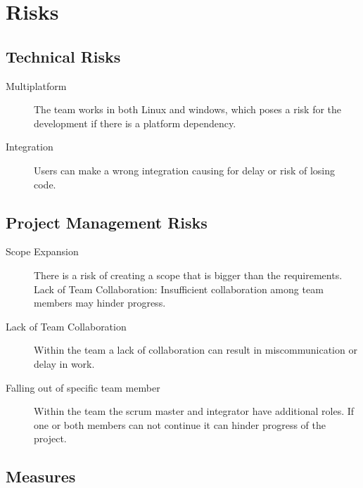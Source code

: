 \documentclass{projdoc}
\begin{document}
\section{Risks}

\subsection{Technical Risks}

\begin{description}
	\item[Multiplatform] The team works in both Linux and windows, which poses a risk
		for the development if there is a platform dependency.
	\item[Integration] Users can make a wrong integration causing for delay or risk of
		losing code.
\end{description}

\subsection{Project Management Risks}

\begin{description}
	\item[Scope Expansion] There is a risk of creating a scope that is bigger than the
		requirements. Lack of Team Collaboration: Insufficient collaboration among team
		members may hinder progress.
	\item[Lack of Team Collaboration] Within the team a lack of collaboration can result in miscommunication or delay in work.
	\item[Falling out of specific team member] Within the team the scrum master and integrator have additional roles. If one or both members can not continue it can hinder progress of the project.
\end{description}

\subsection{Measures}
\end{document}
